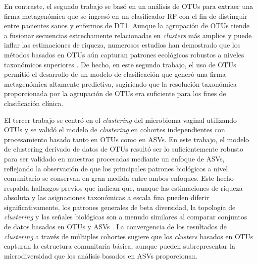 En contraste, el segundo trabajo \cite{2} se basó en un análisis de OTUs para extraer una firma metagenómica que se ingresó en un clasificador RF con el fin de distinguir entre pacientes sanos y enfermos de DT1. Aunque la agrupación de OTUs tiende a fusionar secuencias estrechamente relacionadas en \textit{clusters} más amplios y puede inflar las estimaciones de riqueza, numerosos estudios han demostrado que los métodos basados en OTUs aún capturan patrones ecológicos robustos a niveles taxonómicos superiores \cite{liu2023independent}. De hecho, en este segundo trabajo, el uso de OTUs permitió el desarrollo de un modelo de clasificación que generó una firma metagenómica altamente predictiva, sugiriendo que la resolución taxonómica proporcionada por la agrupación de OTUs era suficiente para los fines de clasificación clínica.

El tercer trabajo \cite{paper3} se centró en el \textit{clustering} del microbioma vaginal utilizando OTUs y se validó el modelo de \textit{clustering} en cohortes independientes con procesamiento basado tanto en OTUs como en ASVs. En este trabajo, el modelo de clustering derivado de datos de OTUs resultó ser lo suficientemente robusto para ser validado en muestras procesadas mediante un enfoque de ASVs, reflejando la observación de que los principales patrones biológicos a nivel comunitario se conservan en gran medida entre ambos enfoques. Este hecho respalda hallazgos previos que indican que, aunque las estimaciones de riqueza absoluta y las asignaciones taxonómicas a escala fina pueden diferir significativamente, los patrones generales de beta diversidad, la topología de \textit{clustering} y las señales biológicas son a menudo similares al comparar conjuntos de datos basados en OTUs y ASVs \cite{chiarello2022ranking}. La convergencia de los resultados de \textit{clustering} a través de múltiples cohortes sugiere que los \textit{clusters} basados en OTUs capturan la estructura comunitaria básica, aunque pueden subrepresentar la microdiversidad que los análisis basados en ASVs proporcionan.

